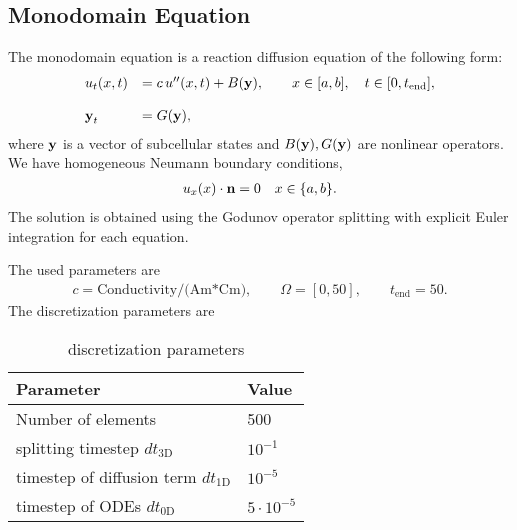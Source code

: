 %
\clearpage
%
%
%
%
\begin{frame}
  \section{Monodomain Equation}
  The monodomain equation is a reaction diffusion equation of the following form:
  \begin{equation}\label{eq:monodomain1d}
    \begin{array}{lll}
      u_t(x,t) &= c\,u''(x,t) + B(\textbf{y}), \qquad x \in [a,b], \quad t \in [0,t_\text{end}],\\[4mm]
      \textbf{y}_t &= G(\textbf{y}),
    \end{array}
  \end{equation}
  where $\textbf{y}$ is a vector of subcellular states and $B(\textbf{y}), G(\textbf{y})$ are nonlinear operators.
  We have homogeneous Neumann boundary conditions,
  \begin{equation}\label{eq:monodomain1d_bc}
    \begin{array}{lll}
      u_x(x) \cdot \textbf{n} = 0 \quad  x \in \{a,b\}.
    \end{array}
  \end{equation}
  The solution is obtained using the Godunov operator splitting with explicit Euler integration for each equation.
\end{frame}
%
%
\begin{frame}
  The used parameters are
  \begin{equation*}
    \begin{array}{lll}
      c = \text{Conductivity/(Am*Cm)},\qquad \Omega = [0,50], \qquad t_\text{end}=50.
    \end{array}
  \end{equation*}
  The discretization parameters are
  \begin{table}[h!]
    \begin{center}
      \begin{tabular}{l|l}
        \textbf{Parameter} & \textbf{Value}\\
        \hline
        Number of elements & 500\\
        splitting timestep $dt_\text{3D}$         & $10^{-1}$\\
        timestep of diffusion term $dt_\text{1D}$ & $10^{-5}$\\
        timestep of ODEs $dt_\text{0D}$           & $5\cdot 10^{-5}$
      \end{tabular}
    \end{center}
    \caption{discretization parameters}
    \label{tab:table_monodomain1}
  \end{table}
\end{frame}
